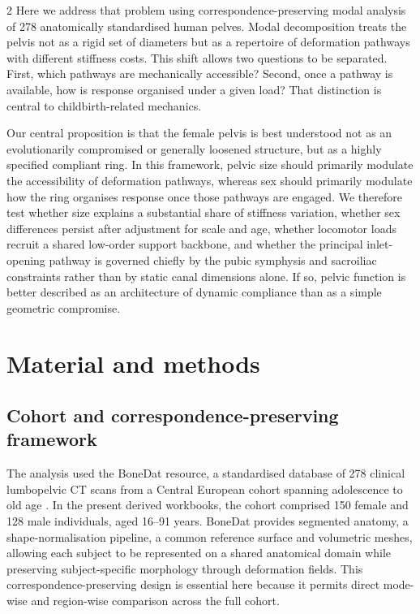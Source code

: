 \documentclass[openacc]{rsproca_new}
\begin{document}
\begin{multicols}{2}
Here we address that problem using correspondence-preserving modal analysis of 278 anatomically standardised human pelves. Modal decomposition treats the pelvis not as a rigid set of diameters but as a repertoire of deformation pathways with different stiffness costs. This shift allows two questions to be separated. First, which pathways are mechanically accessible? Second, once a pathway is available, how is response organised under a given load? That distinction is central to childbirth-related mechanics.

Our central proposition is that the female pelvis is best understood not as an evolutionarily compromised or generally loosened structure, but as a highly specified compliant ring. In this framework, pelvic size should primarily modulate the accessibility of deformation pathways, whereas sex should primarily modulate how the ring organises response once those pathways are engaged. We therefore test whether size explains a substantial share of stiffness variation, whether sex differences persist after adjustment for scale and age, whether locomotor loads recruit a shared low-order support backbone, and whether the principal inlet-opening pathway is governed chiefly by the pubic symphysis and sacroiliac constraints rather than by static canal dimensions alone. If so, pelvic function is better described as an architecture of dynamic compliance than as a simple geometric compromise.

\section{Material and methods}

\subsection{Cohort and correspondence-preserving framework}

The analysis used the BoneDat resource, a standardised database of 278 clinical lumbopelvic CT scans from a Central European cohort spanning adolescence to old age \cite{HenysKuchar2025}. In the present derived workbooks, the cohort comprised 150 female and 128 male individuals, aged 16--91 years. BoneDat provides segmented anatomy, a shape-normalisation pipeline, a common reference surface and volumetric meshes, allowing each subject to be represented on a shared anatomical domain while preserving subject-specific morphology through deformation fields. This correspondence-preserving design is essential here because it permits direct mode-wise and region-wise comparison across the full cohort.


\end{multicols}
\end{document}
